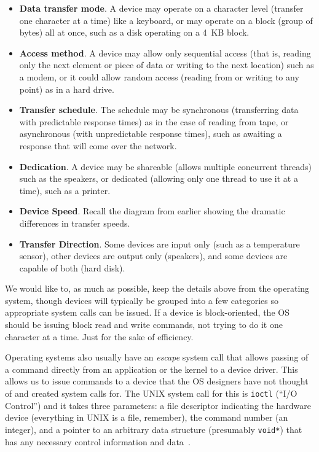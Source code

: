 \begin{itemize}
\item \textbf{Data transfer mode}. A device may operate on a character level (transfer one character at a time) like a keyboard, or may operate on a block (group of bytes) all at once, such as a disk operating on a 4~KB block.
\item \textbf{Access method}. A device may allow only sequential access (that is, reading only the next element or piece of data or writing to the next location) such as a modem, or it could allow random access (reading from or writing to any point) as in a hard drive.
\item \textbf{Transfer schedule}. The schedule may be synchronous (transferring data with predictable response times) as in the case of reading from tape, or asynchronous (with unpredictable response times), such as awaiting a response that will come over the network.
\item \textbf{Dedication}. A device may be shareable (allows multiple concurrent threads) such as the speakers, or dedicated (allowing only one thread to use it at a time), such as a printer.
\item \textbf{Device Speed}. Recall the diagram from earlier showing the dramatic differences in transfer speeds.
\item \textbf{Transfer Direction}. Some devices are input only (such as a temperature sensor), other devices are output only (speakers), and some devices are capable of both (hard disk).
\end{itemize}

We would like to, as much as possible, keep the details above from the operating system, though devices will typically be grouped into a few categories so appropriate system calls can be issued. If a device is block-oriented, the OS should be issuing block read and write commands, not trying to do it one character at a time. Just for the sake of efficiency.

Operating systems also usually have an \textit{escape} system call that allows passing of a command directly from an application or the kernel to a device driver. This allows us to issue commands to a device that the OS designers have not thought of and created system calls for. The UNIX system call for this is \texttt{ioctl} (``I/O Control'') and it takes three parameters: a file descriptor indicating the hardware device (everything in UNIX is a file, remember), the command number (an integer), and a pointer to an arbitrary data structure (presumably \texttt{void*}) that has any necessary control information and data~\cite{osc}.


